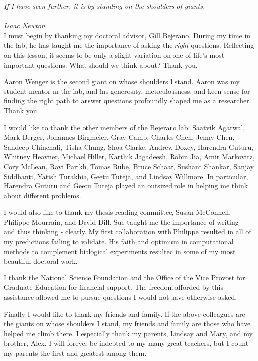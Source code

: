 \emph{If I have seen further, it is by standing on the shoulders of giants.}
\\
\\
\emph{Isaac Newton}
\\

I must begin by thanking my doctoral advisor, Gill Bejerano. During my time in the lab, he has taught me the importance of asking the \emph{right} questions. Reflecting on this lesson, it seems to be only a slight variation on one of life's most important questions: What should we think about? Thank you.

Aaron Wenger is the second giant on whose shoulders I stand. Aaron was my student mentor in the lab, and his generosity, meticulousness, and keen sense for finding the right path to answer questions profoundly shaped me as a researcher. Thank you.

I would like to thank the other members of the Bejerano lab: Saatvik Agarwal, Mark Berger, Johannes Birgmeier, Gray Camp, Charles Chen, Jenny Chen, Sandeep Chinchali, Tisha Chung, Shoa Clarke, Andrew Doxey, Harendra Guturu, Whitney Heavner, Michael Hiller, Karthik Jagadeesh, Robin Jia, Amir Markovitz, Cory McLean, Ravi Parikh, Tomas Rube, Bruce Schaar, Sushant Shankar, Sanjay Siddhanti, Yatish Turakhia, Geetu Tuteja, and Lindsay Willmore. In particular, Harendra Guturu and Geetu Tuteja played an outsized role in helping me think about different problems. 

I would also like to thank my thesis reading committee, Susan McConnell, Philippe Mourrain, and David Dill. Sue taught me the importance of writing - and thus thinking - clearly. My first collaboration with Philippe resulted in all of my predictions failing to validate. His faith and optimism in computational methods to complement biological experiments resulted in some of my most beautiful doctoral work.

I thank the National Science Foundation and the Office of the Vice Provost for Graduate Education for financial support. The freedom afforded by this assistance allowed me to pursue questions I would not have otherwise asked.

Finally I would like to thank my friends and family. If the above colleagues are the giants on whose shoulders I stand, my friends and family are those who have helped me climb there. I especially thank my parents, Lindsay and Mary, and my brother, Alex. I will forever be indebted to my many great teachers, but I count my parents the first and greatest among them.

